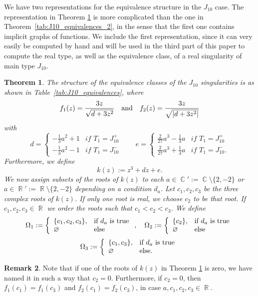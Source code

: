 \documentclass[noend]{amsproc}
\newtheorem{theorem}{Theorem}
\theoremstyle{definition}
\newtheorem{remark}[theorem]{Remark}
\DeclareMathOperator{\R}{\mathbb{R}}
\DeclareMathOperator{\C}{\mathbb{C}}
\begin{document}
We have two representations for the equivalence structure in the $J_{10}$ case. The representation in Theorem \ref{tab:ThmJ10_equivalences} is more complicated than the one in  Theorem~\ref{tab:J10_equivalences_2}, in the sense that the first one contains implicit graphs of functions. We include the first representation, since it can very easily be computed by hand and will be used in the third part of this paper to compute the real type, as well as the equivalence class, of a real singularity of main type $J_{10}$.
\begin{theorem}\label{tab:ThmJ10_equivalences}
The structure of the equivalence classes of the $J_{10}$ singularities is as shown
in Table~\ref{tab:J10_equivalences}, where 
\[f_1(z)=\frac{3z}{\sqrt{d+3z^2}}\quad\textnormal{and}\quad f_2(z)=\frac{3z}{\sqrt{|d+3z^2|}}\]
with 
\begin{equation*}
d=\left\{\begin{array}{ll}-\frac{1}{3}a^2+1&\textit{if $T_1=J_{10}^+$}\\-\frac{1}{3}a^2-1&\textit{if $T_1=J_{10}^-$}\end{array}\right.\qquad e=\left\{\begin{array}{ll}\frac{2}{27}a^3-\frac{1}{3}a&\textit{if $T_1=J_{10}^+$}\\\frac{2}{27}a^3+\frac{1}{3}a&\textit{if $T_1=J_{10}^-$.}\end{array}\right.
\end{equation*}
Furthermore, we define
\[k(z):=z^3+dz+e.\]
We now assign subsets of the roots of $k(z)$ to each $a\in\C':=\C\setminus\{2,-2\}$ or $a\in\R':=\R\setminus\{2,-2\}$ depending on a condition $d_a$. Let $c_1,c_2,c_3$ be the three complex roots of $k(z)$. If only one root is real, we choose $c_2$ to be that root. If $c_1,c_2,c_3\in\R$ we order the roots such that $c_1<c_2<c_3$. We define
\[\Omega_1:=\left\{\begin{array}{ll}\{c_1,c_2,c_3\},&\textnormal{if $d_a$ is true}\\\varnothing&\textnormal{else}\end{array}\right.,\quad\Omega_2:=\left\{\begin{array}{ll}\{c_2\},&\textnormal{if $d_a$ is true}\\\varnothing&\textnormal{else}\end{array}\right.\]\[\Omega_3:=\left\{\begin{array}{ll}\{c_1,c_3\},&\textnormal{if $d_a$ is true}\\\varnothing&\textnormal{else.}\end{array}\right.\]

\end{theorem}
\begin{remark}
Note that if one of the roots of $k(z)$ in Theorem \ref{tab:ThmJ10_equivalences} is zero, we have named it in such a way that $c_2=0$. Furthermore, if $c_2=0$, then $f_1(c_1)=f_1(c_3)$ and $f_2(c_1)=f_2(c_3)$, in case $a,c_1,c_2,c_3\in\R$.
\end{remark}
\end{document}
